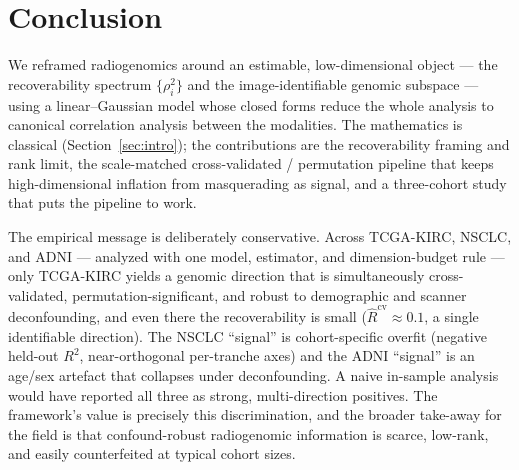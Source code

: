 \documentclass{article}
\begin{document}
\section{Conclusion}
\label{sec:conclusion}

We reframed radiogenomics around an estimable, low-dimensional object --- the
recoverability spectrum $\{\rho_i^2\}$ and the image-identifiable genomic
subspace --- using a linear--Gaussian model whose closed forms reduce the whole
analysis to canonical correlation analysis between the modalities. The
mathematics is classical (Section~\ref{sec:intro}); the contributions are the
recoverability framing and rank limit, the scale-matched cross-validated /
permutation pipeline that keeps high-dimensional inflation from masquerading as
signal, and a three-cohort study that puts the pipeline to work.

The empirical message is deliberately conservative. Across TCGA-KIRC, NSCLC, and
ADNI --- analyzed with one model, estimator, and dimension-budget rule --- only
TCGA-KIRC yields a genomic direction that is simultaneously cross-validated,
permutation-significant, and robust to demographic and scanner deconfounding, and
even there the recoverability is small ($\hat R^{\mathrm{cv}}\approx 0.1$, a
single identifiable direction). The NSCLC ``signal'' is cohort-specific overfit
(negative held-out $R^2$, near-orthogonal per-tranche axes) and the ADNI
``signal'' is an age/sex artefact that collapses under deconfounding. A naive
in-sample analysis would have reported all three as strong, multi-direction
positives. The framework's value is precisely this discrimination, and the
broader take-away for the field is that confound-robust radiogenomic information
is scarce, low-rank, and easily counterfeited at typical cohort sizes.
\end{document}

